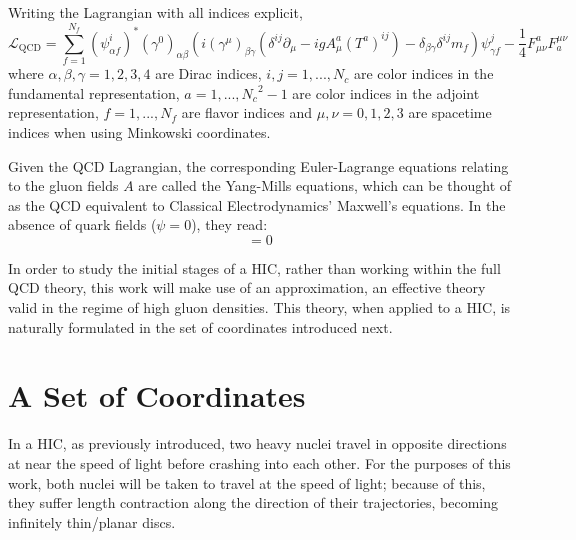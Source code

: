 Writing the Lagrangian with all indices explicit,
\begin{equation}
	\mathcal{L}_{\text{QCD}} =  \sum_{f=1}^{N_f} \left(\psi_{\alpha f}^i \right)^*  \left( \gamma^0  \right)_{\alpha \beta} \left(i \left(\gamma^\mu \right)_{\beta \gamma} \left( \delta^{ij} \partial_\mu - i g A^a_\mu \left( T^a \right)^{ij} \right) - \delta_{\beta \gamma} \delta^{ij} m_f \right) \psi_{\gamma f}^j - \frac{1}{4} F_{\mu \nu}^a F^{\mu \nu}_a
	\label{eq:QCD_Lagrangian_Indices}
\end{equation}
where $\alpha, \beta, \gamma = 1,2,3,4$ are Dirac indices, $i,j=1, ..., N_c$ are color indices in the fundamental representation, $a = 1, ..., {N_c}^2-1$ are color indices in the adjoint representation, $f = 1, ..., N_f$ are flavor indices and $\mu,\nu = 0,1,2,3$ are spacetime indices when using Minkowski coordinates.


Given the QCD Lagrangian, the corresponding Euler-Lagrange equations relating to the gluon fields $A$ are called the Yang-Mills equations, which can be thought of as the QCD equivalent to Classical Electrodynamics' Maxwell's equations.
In the absence of quark fields ($\psi=0$), they read:
\begin{equation}
	[D_\mu, F^{\mu \nu}] = 0
	\label{eq:homogenous_Yang-Mills}
\end{equation}

In order to study the initial stages of a \gls{HIC}, rather than working within the full \gls{QCD} theory, this work will make use of an approximation, an effective theory valid in the regime of high gluon densities. This theory, when applied to a \gls{HIC}, is naturally formulated in the set of coordinates introduced next.

\section{A Set of Coordinates}

In a \gls{HIC}, as previously introduced, two heavy nuclei travel in opposite directions at near the speed of light before crashing into each other. For the purposes of this work, both nuclei will be taken to travel at the speed of light; because of this, they suffer length contraction along the direction of their trajectories, becoming infinitely thin/planar discs.

